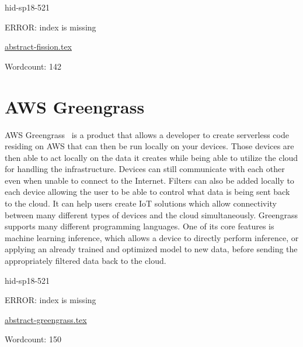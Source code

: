 \begin{IU}

hid-sp18-521

ERROR: index is missing

\href{https://github.com/cloudmesh-community/hid-sp18-521/blob/master//technology/abstract-fission.tex}{abstract-fission.tex}

 

Wordcount: 142

\end{IU}

\section{AWS Greengrass}
AWS Greengrass~\cite{hid-sp18-521-Greengrass} is a product that allows a
developer to create serverless code residing on AWS that can then be run
locally on your devices. Those devices are then able to act locally on the data
it creates while being able to utilize the cloud for handling the infrastructure. 
Devices can still communicate with each other even when unable to connect to the
Internet. Filters can also be added locally to each device allowing the user to be 
able to control what data is being sent back to the cloud. It can help users create
IoT solutions which allow connectivity between many different types of devices
and the cloud simultaneously. Greengrass supports many different programming 
languages. One of its core features is machine learning inference, which allows
a device to directly perform inference, or applying an already trained and 
optimized model to new data, before sending the appropriately filtered data 
back to the cloud.  


\begin{IU}

hid-sp18-521

ERROR: index is missing

\href{https://github.com/cloudmesh-community/hid-sp18-521/blob/master//technology/abstract-greengrass.tex}{abstract-greengrass.tex}

 

Wordcount: 150

\end{IU}

